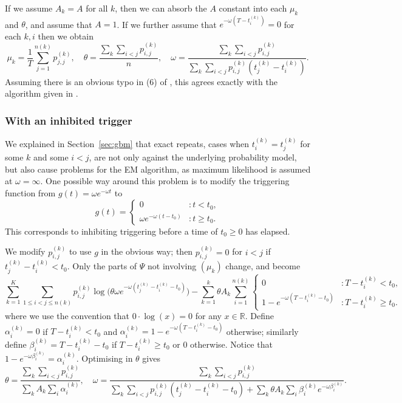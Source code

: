 \documentclass[twoside,a4paper]{article}
\theoremstyle{plain}
\theoremstyle{definition}
\begin{document}
If we assume $A_k=A$ for all $k$, then we can absorb the $A$ constant into each $\mu_k$
and $\theta$, and assume that $A=1$.  If we further assume that $e^{-\omega(T-t^{(k)}_i)}=0$
for each $k,i$ then we obtain
\[ \mu_k = \frac{1}{T} \sum_{j=1}^{n(k)} p^{(k)}_{j,j},
\quad
\theta = \frac{\sum_k \sum_{i<j} p^{(k)}_{i,j}}{n},
\quad
\omega = \frac{\sum_k \sum_{i<j} p^{(k)}_{i,j}}{
\sum_k \sum_{i<j} p^{(k)}_{i,j} (t^{(k)}_j - t^{(k)}_i)}. \]
Assuming there is an obvious typo in (6) of \cite{sepp2},
this agrees exactly with the algorithm given in \cite[Section~2.2]{sepp2}.


\subsubsection{With an inhibited trigger}\label{app:grid_model_em_inhib}

We explained in Section~\ref{sec:gbm} that exact repeats, cases when $t^{(k)}_i = t^{(k)}_j$
for some $k$ and some $i < j$, are not only against the underlying probability model, but
also cause problems for the EM algorithm, as maximum likelihood is assumed at $\omega=\infty$.
One possible way around this problem is to modify the triggering function from $g(t) = \omega
e^{-\omega t}$ to
\[ g(t) = \begin{cases} 0 &: t<t_0, \\ \omega e^{-\omega(t-t_0)} &: t\geq t_0.
\end{cases} \]
This corresponds to inhibiting triggering before a time of $t_0 \geq 0$ has elapsed.

We modify $p^{(k)}_{i,j}$ to use $g$ in the obvious way; then $p^{(k)}_{i,j} = 0$ for
$i<j$ if $t^{(k)}_j - t^{(k)}_i < t_0$.
Only the parts of $\Psi$ not involving $(\mu_k)$ change, and become
\[ \sum_{k=1}^K \sum_{1 \leq i<j\leq n(k)} p^{(k)}_{i,j}
\log\big( \theta\omega e^{-\omega(t^{(k)}_j - t^{(k)}_i - t_0)} \big)
- \sum_{k=1}^k \theta A_k \sum_{i=1}^{n(k)}
\begin{cases} 0 &: T - t^{(k)}_i < t_0, \\
1 - e^{-\omega(T - t^{(k)}_i - t_0)} &: T - t^{(k)}_i \geq t_0. \end{cases} \]
where we use the convention that $0\cdot \log(x) = 0$ for any $x\in\mathbb R$.
Define $\alpha^{(k)}_i = 0$ if $T - t^{(k)}_i < t_0$ and
$\alpha^{(k)}_i = 1 - e^{-\omega(T - t^{(k)}_i - t_0)}$ otherwise; similarly
define $\beta^{(k)}_i = T - t^{(k)}_i - t_0$ if $T - t^{(k)}_i \geq t_0$ or $0$
otherwise.  Notice that $1 - e^{-\omega \beta^{(k)}_i} = \alpha^{(k)}_i$.
Optimising in $\theta$ gives
\[ \theta = \frac{\sum_k \sum_{i<j} p^{(k)}_{i,j}}
{\sum_k A_k \sum_i \alpha^{(k)}_i},
\quad
\omega = \frac{\sum_k \sum_{i<j} p^{(k)}_{i,j}}
{\sum_k \sum_{i<j} p^{(k)}_{i,j}(t^{(k)}_j - t^{(k)}_i - t_0)
+ \sum_k \theta A_k \sum_i \beta^{(k)}_i e^{-\omega\beta^{(k)}_i}
}. \]
\end{document}
